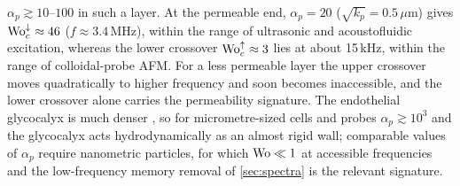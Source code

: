 $\alpha_p\gtrsim10$--$100$ in such a layer. At the permeable end, $\alpha_p=20$ ($\sqrt{k_p}=0.5\,\mu$m) gives
$\mathrm{Wo}_c^{\downarrow}\approx46$ ($f\approx3.4$\,MHz), within the range of ultrasonic and acoustofluidic excitation, whereas
the lower crossover $\mathrm{Wo}_c^{\uparrow}\approx3$ lies at about 15\,kHz, within the range of colloidal-probe AFM. For a less
permeable layer the upper crossover moves quadratically to higher frequency and soon becomes inaccessible, and the
lower crossover alone carries the permeability signature. The endothelial glycocalyx is much denser
, so for
micrometre-sized cells and probes $\alpha_p\gtrsim10^3$ and the glycocalyx acts hydrodynamically as an almost rigid
wall; comparable values of $\alpha_p$ require nanometric particles, for which $\mathrm{Wo}\ll1$ at accessible frequencies and the
low-frequency memory removal of \cref{sec:spectra} is the relevant signature.
